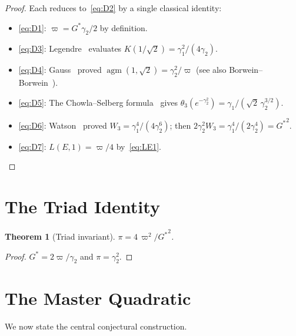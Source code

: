 \documentclass[12pt,reqno]{amsart}
\newtheorem{theorem}{Theorem}[section]
\theoremstyle{definition}
\theoremstyle{remark}
\newcommand{\Gstar}{G^{\!*}}
\newcommand{\varpiup}{\varpi}
\newcommand{\agm}{\operatorname{agm}}
\begin{document}
\begin{proof}
Each reduces to~\eqref{eq:D2} by a single classical identity:
\begin{itemize}
  \item \eqref{eq:D1}: $\varpiup = \Gstar\gamma_{2}/2$ by definition.
  \item \eqref{eq:D3}: Legendre~\cite{Legendre} evaluates
    $K(1/\!\sqrt{2}) = \gamma_{1}^{2}/(4\gamma_{2})$.
  \item \eqref{eq:D4}: Gauss~\cite{Gauss1799} proved
    $\agm(1,\sqrt{2}) = \gamma_{2}^{2}/\varpiup$
    (see also Borwein--Borwein~\cite{BorweinBorwein}).
  \item \eqref{eq:D5}: The Chowla--Selberg formula~\cite{ChowlaSelberg}
    gives
    $\theta_{3}(e^{-\gamma_{2}^{2}})
    = \gamma_{1}/(\sqrt{2}\,\gamma_{2}^{3/2})$.
  \item \eqref{eq:D6}: Watson~\cite{Watson} proved
    $W_{3} = \gamma_{1}^{4}/(4\gamma_{2}^{6})$; then
    $2\gamma_{2}^{2}W_{3} = \gamma_{1}^{4}/(2\gamma_{2}^{4}) = {{\Gstar}}^{2}$.
  \item \eqref{eq:D7}: $L(E,1)=\varpiup/4$ by~\eqref{eq:LE1}.\qedhere
\end{itemize}
\end{proof}


\section{The Triad Identity}\label{sec:triad}

\begin{theorem}[Triad invariant]\label{thm:triad}
$\pi = 4\,\varpiup^{2}/{{\Gstar}}^{2}$.
\end{theorem}

\begin{proof}
$\Gstar = 2\varpiup/\gamma_{2}$ and $\pi=\gamma_{2}^{2}$.
\end{proof}


\section{The Master Quadratic}\label{sec:quadratic}

We now state the central conjectural construction.
\end{document}
